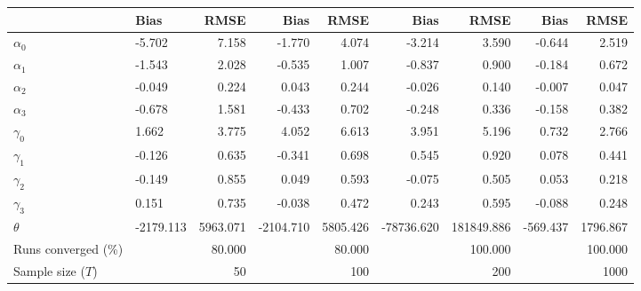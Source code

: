 
\begin{tabular}[t]{llrrrrrrr}
\toprule
  & Bias & RMSE & Bias & RMSE & Bias & RMSE & Bias & RMSE\\
\midrule
$\alpha_{0}$ & -5.702 & 7.158 & -1.770 & 4.074 & -3.214 & 3.590 & -0.644 & 2.519\\
$\alpha_{1}$ & -1.543 & 2.028 & -0.535 & 1.007 & -0.837 & 0.900 & -0.184 & 0.672\\
$\alpha_{2}$ & -0.049 & 0.224 & 0.043 & 0.244 & -0.026 & 0.140 & -0.007 & 0.047\\
$\alpha_{3}$ & -0.678 & 1.581 & -0.433 & 0.702 & -0.248 & 0.336 & -0.158 & 0.382\\
$\gamma_{0}$ & 1.662 & 3.775 & 4.052 & 6.613 & 3.951 & 5.196 & 0.732 & 2.766\\
$\gamma_{1}$ & -0.126 & 0.635 & -0.341 & 0.698 & 0.545 & 0.920 & 0.078 & 0.441\\
$\gamma_{2}$ & -0.149 & 0.855 & 0.049 & 0.593 & -0.075 & 0.505 & 0.053 & 0.218\\
$\gamma_{3}$ & 0.151 & 0.735 & -0.038 & 0.472 & 0.243 & 0.595 & -0.088 & 0.248\\
$\theta$ & -2179.113 & 5963.071 & -2104.710 & 5805.426 & -78736.620 & 181849.886 & -569.437 & 1796.867\\
Runs converged (\%) &  & 80.000 &  & 80.000 &  & 100.000 &  & 100.000\\
Sample size ($T$) &  & 50 &  & 100 &  & 200 &  & 1000\\
\bottomrule
\end{tabular}
